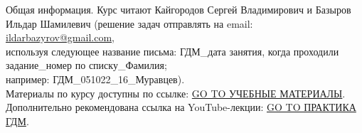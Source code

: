 \documentclass[main.tex]{subfiles}
\begin{document}
Общая информация. Курс читают Кайгородов Сергей Владимирович и Базыров Ильдар Шамилевич (решение задач отправлять на email: \href{mailto:ildarbazyrov@gmail.com}{ildarbazyrov@gmail.com},\\
используя следующее название письма: ГДМ\_дата занятия, когда проходили задание\_номер по списку\_Фамилия;\\
например: ГДМ\_051022\_16\_Муравцев).\\
Материалы по курсу доступны по ссылке: \href{https://csspbstu-my.sharepoint.com/:f:/g/personal/muravtsev_aa_edu_spbstu_ru/Epiacj6WFMBHqIF6E3YQgCMB7yi5NAA1ycqFLqrTZMhJ4w?e=i2agP0}{GO TO УЧЕБНЫЕ МАТЕРИАЛЫ}.\\
Дополнительно рекомендована ссылка на YouTube-лекции: \href{https://youtube.com/playlist?list=PLDW64ZxU0_y5QCvZ048VptkQPoKJZPdEc}{GO TO ПРАКТИКА ГДМ}.
\end{document}
